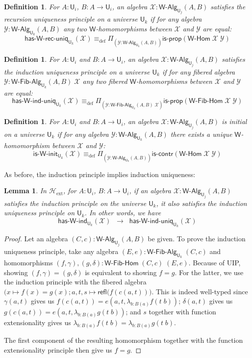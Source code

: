 \documentclass[reqno,10pt,a4paper,oneside]{amsart}
\numberwithin{equation}{section}
\theoremstyle{mythm}
\newtheorem{lemma}[theorem]{Lemma}
\theoremstyle{mydef}
\newtheorem{definition}[theorem]{Definition}
\theoremstyle{myrmk}
\newcommand{\deq}{\equiv}
\newcommand{\defeq}{\deq_{\mathrm{def}}}
\newcommand{\Hext}{\mathcal{H}_{\mathrm{ext}}}
\newcommand{\iscontr}{\mathsf{is}\text{-}\mathsf{contr}}
\newcommand{\isprop}{\mathsf{is}\text{-}\mathsf{prop}}
\newcommand{\prd}[1]{\Pi_{#1}}
\newcommand{\lam}[1]{\lambda_{#1}}
\newcommand{\refl}{\mathsf{refl}}
\newcommand{\W}{\mathsf{W}}
\newcommand{\UU}{\mathsf{U}}
\newcommand{\WAlg}{\mathsf{W}\text{-}\mathsf{Alg}}
\newcommand{\WFibAlg}{\mathsf{W}\text{-}\mathsf{Fib}\text{-}\mathsf{Alg}}
\newcommand{\WHom}{\mathsf{W}\text{-}\mathsf{Hom}}
\newcommand{\WFibHom}{\mathsf{W}\text{-}\mathsf{Fib}\text{-}\mathsf{Hom}}
\newcommand{\HasWInd}{\mathsf{has}\text{-}\mathsf{W}\text{-}\mathsf{ind}}
\newcommand{\HasWRecUniq}{\mathsf{has}\text{-}\mathsf{W}\text{-}\mathsf{rec}\text{-}\mathsf{uniq}}
\newcommand{\HasWIndUniq}{\mathsf{has}\text{-}\mathsf{W}\text{-}\mathsf{ind}\text{-}\mathsf{uniq}}
\newcommand{\IsWInit}{\mathsf{is}\text{-}\mathsf{\W}\text{-}\mathsf{init}}
\newcommand{\X}{\mathcal{X}}
\newcommand{\Y}{\mathcal{Y}}
\begin{document}
\begin{definition}\label{def:WRecUniq}
For $A:\UU_i$, $B : A \to \UU_i$, an algebra $\X : \WAlg_{\UU_j}(A,B)$ \emph{satisfies the recursion uniqueness principle} on a universe $\UU_k$ if for any algebra $\Y : \WAlg_{\UU_k}(A,B)$
any two $\W$-homomorphisms between $\X$ and $\Y$ are equal:
\[ \HasWRecUniq_{\UU_k}(\X) \defeq \prd{(\Y:\WAlg_{\UU_k}(A,B))} \isprop(\WHom \; \X \; \Y) \]
\end{definition}

\begin{definition}\label{def:WIndUniq}
For $A:\UU_i$ and $B : A \to \UU_i$, an algebra $\X : \WAlg_{\UU_j}(A,B)$ \emph{satisfies the induction uniqueness principle} on a universe $\UU_k$ if for any fibered algebra $\Y : \WFibAlg_{\UU_k}(A,B) \; \X$ any two fibered $\W$-homomorphisms between $\X$ and $\Y$ are equal:
\[ \HasWIndUniq_{\UU_k}(\X) \defeq \prd{(\Y:\WFibAlg_{\UU_k}(A,B) \; \X)} \isprop(\WFibHom \; \X \; \Y) \]
\end{definition}

\begin{definition}\label{def:WInit}
For $A:\UU_i$ and $B : A \to \UU_i$, an algebra $\X : \WAlg_{\UU_j}(A,B)$ is \emph{initial} on a universe $\UU_k$ if for any algebra $\Y : \WAlg_{\UU_k}(A,B)$ there exists a unique $\W$-homomorphism between $\X$ and $\Y$:
\[ \IsWInit_{\UU_k}(\X) \defeq \prd{(\Y:\WAlg_{\UU_k}(A,B))} \iscontr(\WHom \; \X \; \Y) \]  
\end{definition}

As before, the induction principle implies induction uniqueness:

\begin{lemma}\label{lem:WIndImpUniq}
In $\Hext$, for $A:\UU_i$, $B : A \to \UU_i$, if an algebra $\X : \WAlg_{\UU_j}(A,B)$ satisfies the induction principle on the universe $\UU_k$, it also satisfies the induction uniqueness principle on $\UU_k$. In other words, we have
\[ \HasWInd_{\UU_k}(\X) \;\; \rightarrow \;\; \HasWIndUniq_{\UU_k}(\X) \]
\end{lemma}
\begin{proof}
Let an algebra $(C,c) : \WAlg_{\UU_j}(A,B)$ be given. To prove the induction uniqueness principle, take any algebra $(E,e) : \WFibAlg_{\UU_k} \; (C,c)$ and homomorphisms $(f,\gamma), (g,\delta) : \WFibHom \; (C,c) \; (E,e)$. Because of UIP, showing $(f,\gamma) = (g,\delta)$ is equivalent to showing $f = g$. For the latter, we use the induction principle with the fibered algebra $\big(x \mapsto f(x) = g(x); a,t,s \mapsto \refl(f(c(a,t)) \big)$. This is indeed well-typed since $\gamma(a,t)$ gives us $f(c(a,t)) = e(a,t,\lam{b:B(a)} f(t\;b))$; $\delta(a,t)$ gives us $g(c(a,t)) = e(a,t,\lam{b:B(a)} g(t\;b))$; and $s$ together with function extensionality gives us
$\lam{b:B(a)} f(t\;b) = \lam{b:B(a)} g(t\;b)$.

The first component of the resulting homomorphism together with the function extensionality principle then give us $f = g$.
\end{proof}
\end{document}
